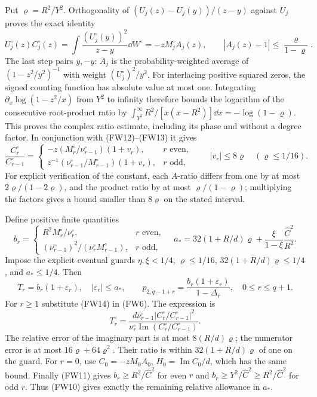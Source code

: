 \documentclass[11pt]{article}
\begin{document}
Put $\varrho=R^2/Y^2$. Orthogonality of
$(U_j(z)-U_j(y))/(z-y)$ against $U_j$ proves the exact identity
\begin{equation}\tag{FW13}
 U_j^\circ(z)C_j^\circ(z)
 =\int\frac{(U_j^\circ(y))^2}{z-y}\dd W^\circ
 =-zM_j^\circ A_j(z),\qquad |A_j(z)-1|\le\frac{\varrho}{1-\varrho}.
\end{equation}
The last step pairs $y,-y$: $A_j$ is the probability-weighted average
of $(1-z^2/y^2)^{-1}$ with weight $(U_j^\circ)^2/y^2$.
For interlacing positive squared zeros, the signed counting function
has absolute value at most one. Integrating
$\partial_x\log(1-z^2/x)$ from $Y^2$ to infinity therefore bounds
the logarithm of the consecutive root-product ratio by
$\int_{Y^2}^\infty R^2/[x(x-R^2)]\dd x=-\log(1-\varrho)$.
This proves the complex ratio estimate, including its phase and
without a degree factor. In conjunction with (FW12)--(FW13) it gives
\begin{equation}\tag{FW14}
 \frac{C_r^\circ}{C_{r-1}^\circ}=
 \begin{cases}
 -z(M_r^\circ/\nu_{r-1}^\circ)(1+v_r),&r\text{ even},\\
 z^{-1}(\nu_{r-1}^\circ/M_{r-1}^\circ)(1+v_r),&r\text{ odd},
 \end{cases}
 \qquad |v_r|\le8\varrho\quad(\varrho\le1/16).
\end{equation}
For explicit verification of the constant, each $A$-ratio differs from
one by at most $2\varrho/(1-2\varrho)$, and the product ratio by at
most $\varrho/(1-\varrho)$; multiplying the factors gives a bound
smaller than $8\varrho$ on the stated interval.

Define positive finite quantities
\begin{equation}\tag{FW15}
 b_r=\begin{cases}
 R^2M_r^\circ/\nu_r^\circ,&r\text{ even},\\
 (\nu_{r-1}^\circ)^2/(\nu_r^\circ M_{r-1}^\circ),&r\text{ odd},
 \end{cases}\quad
 a_*=32(1+R/d)\varrho+
       \frac{\xi}{1-\xi}\frac{\widehat C^2}{R^2}.
\end{equation}
Impose the explicit eventual guards $\eta,\xi<1/4$, $\varrho\le1/16$,
$32(1+R/d)\varrho\le1/4$, and $a_*\le1/4$. Then
\begin{equation}\tag{FW16}
 T_r=b_r(1+\varepsilon_r),\quad |\varepsilon_r|\le a_*,
 \qquad p_{2,q-1+r}=\frac{b_r(1+\varepsilon_r)}{1-\Delta_r},
 \quad 0\le r\le q+1.
\end{equation}
For $r\ge1$ substitute (FW14) in (FW6). The expression is
\[
 T_r^\circ=\frac{d\nu_{r-1}^\circ|C_r^\circ/C_{r-1}^\circ|^2}
 {\nu_r^\circ\operatorname{Im}(C_r^\circ/C_{r-1}^\circ)}.
\]
The relative error of the imaginary part is at most $8(R/d)\varrho$;
the numerator error is at most $16\varrho+64\varrho^2$.
Their ratio is within $32(1+R/d)\varrho$ of one on the guard.
For $r=0$, use $C_0=-zM_0 A_0$, $H_0=\operatorname{Im}C_0/d$,
which has the same bound. Finally (FW11) gives
$b_r\ge R^2/\widehat C^2$ for even $r$ and
$b_r\ge Y^2/\widehat C^2\ge R^2/\widehat C^2$ for odd $r$.
Thus (FW10) gives exactly the remaining relative allowance in $a_*$.
\end{document}
